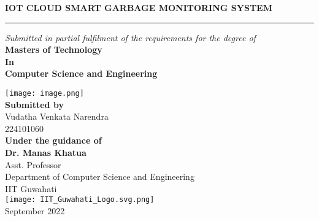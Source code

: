 \documentclass[12pt,letterpaper]{article}
\begin{document}
\begin{center}
   \huge{\textbf{IOT CLOUD SMART GARBAGE MONITORING SYSTEM}}\\[8pt]
\end{center}

\rule{\textwidth}{0.5pt}
\begin{center}
    \large{\textit{Submitted in partial fulfilment of the requirements for the degree of}}\\
    \vspace{0.1 in}
    \large{\textbf{Masters of Technology}\\}
    \large{\textbf{In}\\}
    \large{\textbf{Computer Science and Engineering}}
\end{center}
\begin{center}
    \texttt{[image: image.png]}\\
    \vspace{0.1 in}
    \Large{\textbf{Submitted by}}\\
    \vspace{0.1 in}
    \large{Vudatha Venkata Narendra}\\
    \large{224101060}\\
    \vspace{0.2 in}
    \Large{\textbf{Under the guidance of}}\\
    \vspace{0.1 in}
    \large{\textbf{Dr. Manas Khatua}}\\
    \large{Asst. Professor}\\
    \large{Department of Computer Science and Engineering}\\
    \large{IIT Guwahati}\\
    \vspace{0.2 in}
    \texttt{[image: IIT\_Guwahati\_Logo.svg.png]}\\
    \small{September 2022}\\
\end{center}
\end{document}
